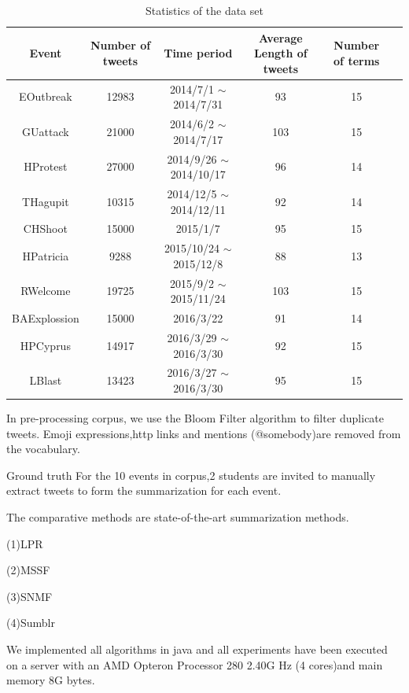 \documentclass{llncs}
\begin{document}
\begin{table}[htp]\label{table:static}
\caption{Statistics of the data set}
\begin{center}
\begin{tabular}{|c|c|c|c|c|c|}
    \hline
    Event & Number of tweets & Time period & Average Length of tweets &  Number of terms\\
    \hline
    EOutbreak & 12983 & 2014/7/1 $\sim$ 2014/7/31 & 93 & 15 \\
    \hline
    GUattack & 21000 & 2014/6/2 $\sim$ 2014/7/17 & 103 & 15 \\
    \hline
    HProtest & 27000 & 2014/9/26 $\sim$ 2014/10/17 & 96 & 14 \\
    \hline
    THagupit & 10315 & 2014/12/5 $\sim$ 2014/12/11 & 92 & 14 \\
    \hline
    CHShoot & 15000 & 2015/1/7 & 95 & 15 \\
    \hline
    HPatricia & 9288 & 2015/10/24 $\sim$ 2015/12/8 & 88 & 13 \\
    \hline
    RWelcome & 19725 & 2015/9/2 $\sim$ 2015/11/24 & 103 & 15 \\
    \hline
    BAExplossion & 15000 & 2016/3/22 & 91 & 14 \\
    \hline
    HPCyprus & 14917 & 2016/3/29 $\sim$ 2016/3/30 & 92 & 15\\
    \hline
    LBlast & 13423 & 2016/3/27 $\sim$ 2016/3/30 & 95 & 15\\
    \hline
\end{tabular}
\end{center}
\label{default}
\end{table}

In pre-processing corpus, we use the Bloom Filter algorithm to filter duplicate tweets. Emoji expressions,http links and mentions (@somebody)are removed from the vocabulary.


Ground truth For the 10 events in corpus,2 students are invited to manually extract tweets to form the summarization for each event.

The comparative methods are  state-of-the-art summarization methods.

(1)LPR

(2)MSSF

(3)SNMF

(4)Sumblr


We implemented all algorithms in java and all experiments have been executed on a server with an AMD Opteron Processor 280 2.40G Hz (4 cores)and main memory 8G bytes.
\end{document}
